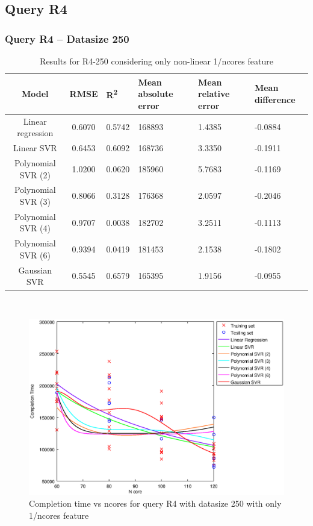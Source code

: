 \documentclass[a4paper,11pt]{article}
\begin{document}
\newpage
\subsection{Query R4}
\subsubsection{Query R4 -- Datasize 250}
\begin{table}[H]
	\centering
	\begin{adjustbox}{center}
		\begin{tabular}{c | c M{1.2cm} M{2.5cm} M{2.5cm} M{1.8cm}}
			Model & RMSE & R\textsuperscript{2} & Mean absolute error & Mean relative error & Mean difference \tabularnewline
			\hline
			Linear regression & 0.6070 & 0.5742 & 168893 & 1.4385 & -0.0884 \\
			Linear SVR & 0.6453 & 0.6092 & 168736 & 3.3350 & -0.1911 \\
			Polynomial SVR (2) & 1.0200 & 0.0620 & 185960 & 5.7683 & -0.1169 \\
			Polynomial SVR (3) & 0.8066 & 0.3128 & 176368 & 2.0597 & -0.2046 \\
			Polynomial SVR (4) & 0.9707 & 0.0038 & 182702 & 3.2511 & -0.1113 \\
			Polynomial SVR (6) & 0.9394 & 0.0419 & 181453 & 2.1538 & -0.1802 \\
			Gaussian SVR & 0.5545 & 0.6579 & 165395 & 1.9156 & -0.0955 \\
		\end{tabular}
	\end{adjustbox}
	\\
	\caption{Results for R4-250 considering only non-linear 1/ncores feature}
	\label{table_R4_prediction_all}
\end{table}

\begin {figure}[hbtp]
\centering
\includegraphics[width=\textwidth]{output/R4_250_ONLY_1_OVER_NCORES/plot_R4_250.eps}
\caption {Completion time vs ncores for query R4 with datasize 250 with only 1/ncores feature}
\end {figure}
\end{document}
